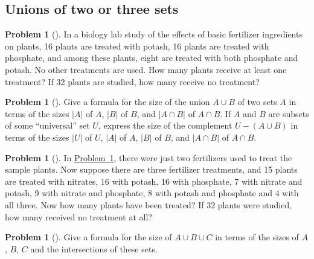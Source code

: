\documentclass[10pt,]{book}
\theoremstyle{plain}
\theoremstyle{definition}
\newtheorem{activity}[project]{Problem}
\theoremstyle{definition}
\numberwithin{equation}{chapter}
\begin{document}
\subsection[{Unions of two or three sets}]{Unions of two or three sets}\label{subsection-51}
\begin{activity}[] \label{fertilizer2}
In a biology lab study of the effects of basic fertilizer ingredients on plants, 16 plants are treated with potash, 16 plants are treated with phosphate, and among these plants, eight are treated with both phosphate and potash. No other treatments are used. How many plants receive at least one treatment? If 32 plants are studied, how many receive no treatment?%
\end{activity}
\begin{activity}[] \label{twosetintersection}
Give a formula for the size of the union \(A\cup B\) of two sets \(A\) in terms of the sizes \(|A|\) of \(A\), \(|B|\) of \(B\), and \(|A\cap B|\) of \(A\cap B\). If \(A\) and \(B\) are subsets of some ``universal'' set \(U\), express the size of the complement \(U-(A\cup B)\) in terms of the sizes \(|U|\) of \(U\), \(|A|\) of \(A\), \(|B|\) of \(B\), and \(|A\cap B|\) of \(A\cap B\).%
\end{activity}
\begin{activity}[] \label{activity-227}
In \hyperref[fertilizer2]{Problem~\ref{fertilizer2}}, there were just two fertilizers used to treat the sample plants. Now suppose there are three fertilizer treatments, and 15 plants are treated with nitrates, 16 with potash, 16 with phosphate, 7 with nitrate and potash, 9 with nitrate and phosphate, 8 with potash and phosphate and 4 with all three. Now how many plants have been treated? If 32 plants were studied, how many received no treatment at all?%
\end{activity}
\begin{activity}[] \label{threesetintersection}
Give a formula for the size of \(A\cup B\cup C\) in terms of the sizes of \(A\), \(B\), \(C\) and the intersections of these sets.%
\end{activity}
\typeout{************************************************}
\typeout{************************************************}
\end{document}
